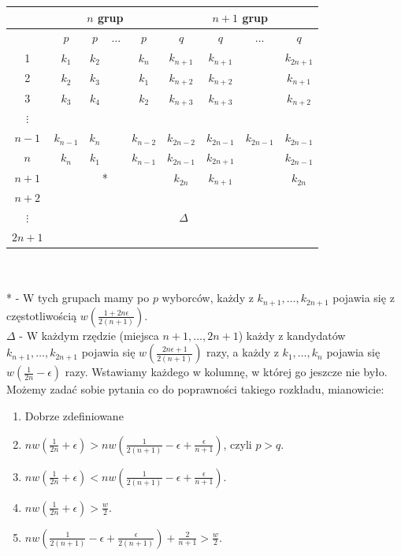 \documentclass[12pt,a4paper]{article}
\theoremstyle{break}
\begin{document}
	\begin{tabular}{|c|cccc|cccc|}\hline
		&\multicolumn{4}{c|}{$n$ grup}&\multicolumn{4}{c|}{$n+1$ grup}\\\hline
		&$p$&$p$&$\dots$&$p$&$q$&$q$&$\dots$&$q$\\\hline
		1&$k_1$&$k_2$&&$k_n$&$k_{n+1}$&$k_{n+1}$&&$k_{2n+1}$\\
		2&$k_2$&$k_3$&&$k_1$&$k_{n+2}$&$k_{n+2}$&&$k_{n+1}$\\
		3&$k_3$&$k_4$&&$k_2$&$k_{n+3}$&$k_{n+3}$&&$k_{n+2}$\\
		
		$\vdots$&&&&&&&&\\
		
		$n-1$&$k_{n-1}$&$k_n$&&$k_{n-2}$&$k_{2n-2}$&$k_{2n-1}$&$k_{2n-1}$&$k_{2n-1}$\\
		$n$&$k_n$&$k_1$&&$k_{n-1}$&$k_{2n-1}$&$k_{2n+1}$&&$k_{2n-1}$\\\hline
		$n+1$&\multicolumn{4}{c|}{*}&$k_{2n}$&$k_{n+1}$&&$k_{2n}$\\\hline
		$n+2$&\multicolumn{8}{|c|}{ }\\
		
		$\vdots$&\multicolumn{8}{|c|}{$\Delta$}\\
		
		$2n+1$&\multicolumn{8}{|c|}{ }\\\hline
	\end{tabular}\\\\
	
	 * - W tych grupach mamy po $p$ wyborców, każdy z $k_{n+1}, \dots, k_{2n+1}$ pojawia się z częstotliwością $w\left(\frac{1+2n\epsilon}{2(n+1)}\right)$.\\
	
	$\Delta$ - W każdym rzędzie (miejsca $n+1, \dots, 2n+1$) każdy z kandydatów $k_{n+1}, \dots, k_{2n+1}$ pojawia się $w\left(\frac{2n\epsilon+1}{2(n+1)}\right)$ razy, a każdy z $k_1, \dots, k_n$ pojawia się $w\left(\frac{1}{2n}-\epsilon\right)$ razy. Wstawiamy każdego w kolumnę, w której go jeszcze nie było. \\
	
	Możemy zadać sobie pytania co do poprawności takiego rozkładu, mianowicie:
	
	\begin{enumerate}[1)]
		\item Dobrze zdefiniowane \\
		\item  $nw\left(\frac{1}{2n}+\epsilon\right) > nw\left(\frac{1}{2(n+1)} - \epsilon + \frac{\epsilon}{n+1}\right)$, czyli $p > q$. \\
		\item  $nw\left(\frac{1}{2n}+\epsilon\right) < nw\left(\frac{1}{2(n+1)} - \epsilon + \frac{\epsilon}{n+1}\right)$. \\
		\item  $nw\left(\frac{1}{2n}+\epsilon\right) > \frac{w}{2}$. \\
		\item  $nw\left(\frac{1}{2(n+1)}-\epsilon + \frac{\epsilon}{2(n+1)}\right) + \frac{2}{n+1} > \frac{w}{2}$. \\
	\end{enumerate}
\end{document}
